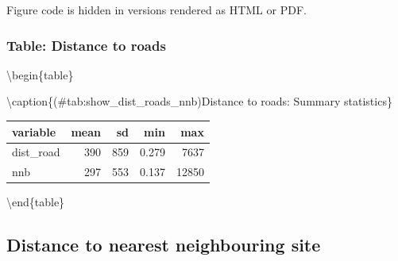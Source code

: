 \documentclass[]{article}
\newenvironment{Shaded}{}{}
\newcommand{\CommentTok}[1]{\textcolor[rgb]{0.00,0.50,0.00}{#1}}
\newcommand{\DataTypeTok}[1]{#1}
\newcommand{\KeywordTok}[1]{\textcolor[rgb]{0.00,0.00,1.00}{#1}}
\newcommand{\NormalTok}[1]{#1}
\newcommand{\OperatorTok}[1]{#1}
\newcommand{\StringTok}[1]{\textcolor[rgb]{0.00,0.50,0.50}{#1}}
\begin{document}
Figure code is hidden in versions rendered as HTML or PDF.

\hypertarget{table-distance-to-roads}{%
\subsubsection{Table: Distance to roads}\label{table-distance-to-roads}}

\begin{Shaded}
\end{Shaded}

\textbackslash{}begin\{table\}

\textbackslash{}caption\{(\#tab:show\_dist\_roads\_nnb)Distance to roads: Summary statistics\}
\centering

\begin{tabular}[t]{l|r|r|r|r}
\hline
variable & mean & sd & min & max\\
\hline
dist\_road & 390 & 859 & 0.279 & 7637\\
\hline
nnb & 297 & 553 & 0.137 & 12850\\
\hline
\end{tabular}

\textbackslash{}end\{table\}

\hypertarget{distance-to-nearest-neighbouring-site}{%
\subsection{Distance to nearest neighbouring site}\label{distance-to-nearest-neighbouring-site}}
\end{document}
